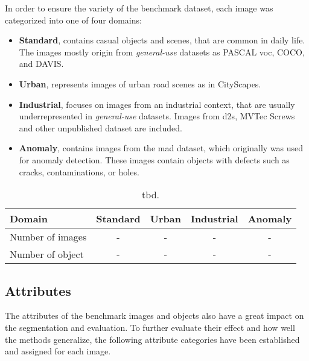 In order to ensure the variety of the benchmark dataset, each image was categorized into one of four domains:
%
\begin{itemize}
	\item \textbf{Standard}, contains casual objects and scenes, that are common in daily life.
	The images mostly origin from \textit{general-use} datasets as PASCAL \gls{voc}, COCO, and DAVIS.
	\item \textbf{Urban}, represents images of urban road scenes as in CityScapes.
	\item \textbf{Industrial}, focuses on images from an industrial context, that are usually underrepresented in  \textit{general-use} datasets.
	Images from \gls{d2s}, MVTec Screws and other unpublished dataset are included.
	\item \textbf{Anomaly}, contains images from the \gls{mad} dataset, which originally was used for anomaly detection.
	These images contain objects with defects such as cracks, contaminations, or holes.
\end{itemize}

\begin{table}[h!]
	\centering
	\begin{tabular}{l|c|c|c|c}
		Domain				& Standard & Urban & Industrial & Anomaly \\
		\hline
		Number of images 	& - & - & - & - \\
		Number of object 	& - & - & - & - \\
	\end{tabular}
	\caption[tbd.]{
		tbd.
		} \label{tab:ch4:domains_overview}
\end{table}

\subsection{Attributes}\label{ord:ch4:sec2:subsec2}

The attributes of the benchmark images and objects also have a great impact on the segmentation and evaluation.
To further evaluate their effect and how well the methods generalize, the following attribute categories have been established and assigned for each image.

